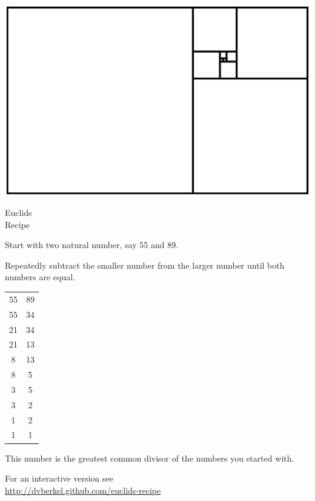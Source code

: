 \documentclass[a4paper]{article}
\begin{document}
\vspace*{\fill}

\includegraphics[width=\textwidth]{image/euclid.ps}

\begin{center}
  \Huge
  Euclids\\
  Recipe
\end{center}

Start with two natural number, say 55 and 89.

Repeatedly subtract the smaller number from the larger number until
both numbers are equal.

\begin{center}
  \begin{tabular}{cc}
    55 & 89 \\
    55 & 34 \\
    21 & 34 \\
    21 & 13 \\
    8 & 13 \\
    8 &  5 \\
    3 &  5 \\
    3 &  2 \\
    1 &  2 \\
    1 &  1 \\
  \end{tabular}
\end{center}

This number is the greatest common divisor of the numbers you started with.

For an interactive version see\\
{\scriptsize\url{http://dvberkel.github.com/euclids-recipe}}

\vspace{\fill}
\end{document}
